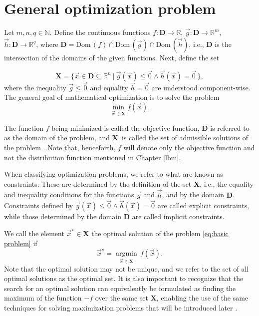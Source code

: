 \section{General optimization problem}

Let $m, n, q \in \mathbb{N}$. Define the continuous functions $f : \mathbf{D} \rightarrow \mathbb{R}$, $ \vec{g} : \mathbf{D} \rightarrow \mathbb{R}^m$, $ \vec{h} : \mathbf{D} \rightarrow \mathbb{R}^q $, where $ \mathbf{D} = \mathrm{Dom} \, (f) \cap \mathrm{Dom} \, (\vec{g}) \cap \mathrm{Dom} \, (\vec{h})$, i.e., $ \mathbf{D} $ is the intersection of the domains of the given functions. Next, define the set

\begin{equation}\label{eq:admissible solution}
	\mathbf{X} = \big\{ \vec{x} \in \mathbf{D} \subseteq \mathbb{R}^n \ | \ \vec{g} (\vec{x}) \leq \vec{0} \wedge \vec{h} (\vec{x}) = \vec{0} \, \big\},
\end{equation}
where the inequality $ \vec{g} \leq \vec{0} $ and equality $ \vec{h} = \vec{0} $ are understood component-wise. The general goal of mathematical optimization is to solve the problem
\begin{equation}\label{eq:basic problem}
	\min_{\vec{x} \in \mathbf{X}} f(\vec{x}).
\end{equation}

The function $f$ being minimized is called the objective function, $\mathbf{D}$ is referred to as the domain of the problem, and $\mathbf{X}$~is called the set of admissible solutions of the problem \cite{Bert}. Note that, henceforth, $f$ will denote only the objective function and not the distribution function mentioned in Chapter \ref{lbm}.

When classifying optimization problems, we refer to what are known as constraints. These are determined by the definition of the set $ \mathbf{X} $, i.e., the equality and inequality conditions for the functions $ \vec{g} $ and $ \vec{h} $, and by the domain $ \mathbf{D} $. Constraints defined by $ \vec{g} (\vec{x}) \leq \vec{0} \wedge \vec{h} (\vec{x}) = \vec{0} $ are called explicit constraints, while those determined by the domain $ \mathbf{D} $ are called implicit constraints.

We call the element $ \vec{x}^{\star} \in \mathbf{X} $ the optimal solution of the problem \eqref{eq:basic problem} if
\begin{equation}
	\vec{x}^{\star} = \operatorname*{argmin}_{\vec{x} \in \mathbf{X}} \, f(\vec{x}).
\end{equation}
Note that the optimal solution may not be unique, and we refer to the set of all optimal solutions as the optimal set. It is also important to recognize that the search for an optimal solution can equivalently be formulated as finding the maximum of the function $ -f$ over the same set $ \mathbf{X}$, enabling the use of the same techniques for solving maximization problems that will be introduced later \cite{Bert, non-linear-textbook}.

